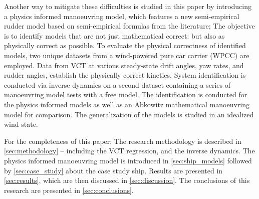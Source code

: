 Another way to mitigate these difficulties is studied in this paper by introducing a physics informed manoeuvring model, which features a new semi-empirical rudder model based on semi-empirical formulas from the literature;
The objective is to identify models that are not just mathematical correct: but also as physically correct as possible.
To evaluate the physical correctness of identified models, two unique datasets from a wind-powered pure car carrier (WPCC) are employed. Data from VCT at various steady-state drift angles, yaw rates, and rudder angles, establish the physically correct kinetics. System identification is conducted via inverse dynamics \citep{faber_inverse_2018} on a second dataset containing a series of manoeuvring model tests with a free model. The identification is conducted for the physics informed models as well as an Abkowitz mathematical manoeuvring model for comparison. The generalization of the models is studied in an idealized wind state.

For the completeness of this paper; The research methodology is described in \autoref{sec:methodology} -- including the VCT regression, and the inverse dynamics. The physics informed manoeuvring model is introduced in \autoref{sec:ship_models} followed by \autoref{sec:case_study} about the case study ship. Results are presented in \autoref{sec:results}, which are then discussed in \autoref{sec:discussion}. The conclusions of this research are presented in \autoref{sec:conclusions}.


